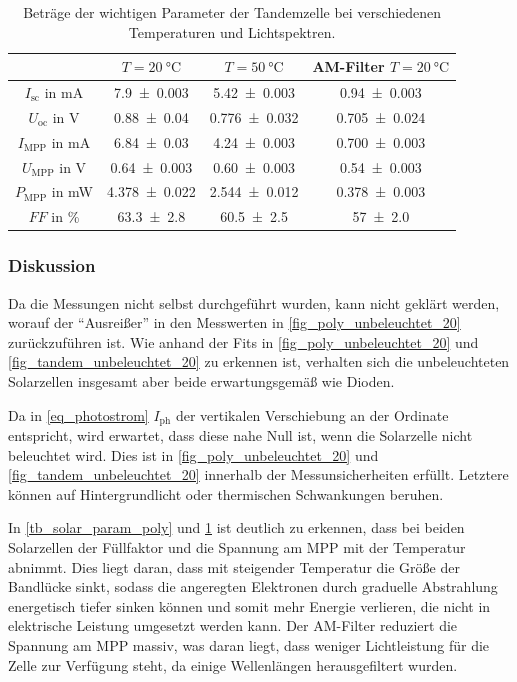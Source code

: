 \documentclass[
	a4paper,
	12pt,
	pagesize,
	ngerman
]{scrartcl}
\begin{document}
\begin{table}[H]
		\centering
		\begin{tabular}{c | c | c | c  }
			 &$T=\SI{20}{\celsius}$& $T=\SI{50}{\celsius}$& AM-Filter $T=\SI{20}{\celsius}$ \\ \hline
			 $I_\text{sc}$ in \si{mA}& \SI{7.9+-0.003}{}&\SI{5.42+-0.003}{}& \SI{0.94+-0.003}{} \\
			 $U_\text{oc}$ in \si{V}&\SI{0.88+-0.04}{}&\SI{0.776+-0.032}{}&\SI{0.705+-0.024}{} \\
			 $I_\text{MPP}$ in \si{mA}&\SI{6.84+-0.03}{}&\SI{4.24+-0.003}{}&\SI{0.700+-0.003}{} \\
			 $U_\text{MPP}$ in \si{V}&\SI{0.64+-0.003}{}&\SI{0.60+-0.003}{}&\SI{0.54+-0.003}{} \\
			 $P_\text{MPP}$ in \si{mW}&\SI{4.378+-0.022}{}&\SI{2.544+-0.012}{}&\SI{0.378+-0.003}{} \\
			 $FF$ in \si{\percent}&\SI{63.3+-2.8}{}&\SI{60.5+-2.5}{}&\SI{57+-2.0}{} \\
		\end{tabular}
		\caption{
		Beträge der wichtigen Parameter der Tandemzelle bei verschiedenen Temperaturen und Lichtspektren.
		}
		\label{tb_solar_param_tandem}
\end{table}
	\subsubsection{Diskussion}
	Da die Messungen nicht selbst durchgeführt wurden, kann nicht geklärt werden, worauf der \enquote{Ausreißer} in den Messwerten in \cref{fig_poly_unbeleuchtet_20} zurückzuführen ist.
	Wie anhand der Fits in \cref{fig_poly_unbeleuchtet_20} und \cref{fig_tandem_unbeleuchtet_20} zu erkennen ist, verhalten sich die unbeleuchteten Solarzellen insgesamt aber beide erwartungsgemäß wie Dioden.

	Da in \cref{eq_photostrom} $I_\text{ph}$ der vertikalen Verschiebung an der Ordinate entspricht, wird erwartet, dass diese nahe Null ist, wenn die Solarzelle nicht beleuchtet wird.
	Dies ist in \cref{fig_poly_unbeleuchtet_20} und \cref{fig_tandem_unbeleuchtet_20} innerhalb der Messunsicherheiten erfüllt.
	Letztere können auf Hintergrundlicht oder thermischen Schwankungen beruhen.

	In \cref{tb_solar_param_poly} und \cref{tb_solar_param_tandem} ist deutlich zu erkennen, dass bei beiden Solarzellen der Füllfaktor und die Spannung am MPP mit der Temperatur abnimmt.
	Dies liegt daran, dass mit steigender Temperatur die Größe der Bandlücke sinkt, sodass die angeregten Elektronen durch graduelle Abstrahlung energetisch tiefer sinken können und somit mehr Energie verlieren, die nicht in elektrische Leistung umgesetzt werden kann.
	Der AM-Filter reduziert die Spannung am MPP massiv, was daran liegt, dass weniger Lichtleistung für die Zelle zur Verfügung steht, da einige Wellenlängen herausgefiltert wurden.
\end{document}
